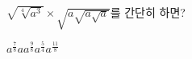 $\sqrt{\sqrt[4]{a^3}}\times\sqrt{a\sqrt{a\sqrt{a}}}$를 간단히 하면? 
\begin{choices32}{$a^{\frac{7}{8}}$}{$a$}{$a^{\frac{9}{8}}$}{$a^{\frac{5}{4}}$}{$a^{\frac{11}{8}}$}\end{choices32}
